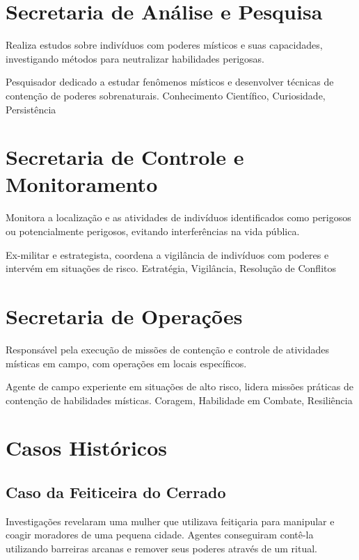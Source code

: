 \section{Secretaria de Análise e Pesquisa}
Realiza estudos sobre indivíduos com poderes místicos e suas capacidades, investigando métodos para neutralizar habilidades perigosas.

{Pesquisador dedicado a estudar fenômenos místicos e desenvolver técnicas de contenção de poderes sobrenaturais.}
{Conhecimento Científico, Curiosidade, Persistência}

\section{Secretaria de Controle e Monitoramento}
Monitora a localização e as atividades de indivíduos identificados como perigosos ou potencialmente perigosos, evitando interferências na vida pública.

{Ex-militar e estrategista, coordena a vigilância de indivíduos com poderes e intervém em situações de risco.}
{Estratégia, Vigilância, Resolução de Conflitos}

\section{Secretaria de Operações}
Responsável pela execução de missões de contenção e controle de atividades místicas em campo, com operações em locais específicos.

{Agente de campo experiente em situações de alto risco, lidera missões práticas de contenção de habilidades místicas.}
{Coragem, Habilidade em Combate, Resiliência}


\section{Casos Históricos}

\subsection{Caso da Feiticeira do Cerrado}

Investigações revelaram uma mulher que utilizava feitiçaria para manipular e coagir moradores de uma pequena cidade. Agentes conseguiram contê-la utilizando barreiras arcanas e remover seus poderes através de um ritual.
   
